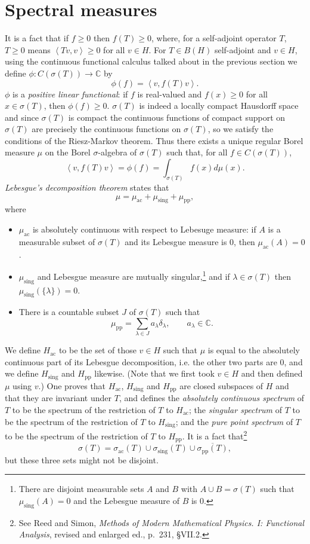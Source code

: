 \documentclass{article}
\newcommand{\inner}[2]{\left\langle #1, #2 \right\rangle}
\begin{document}
\section{Spectral measures}
It is a fact that if $f \geq 0$ then $f(T) \geq 0$, where, for a self-adjoint operator $T$, $T \geq 0$ means $\inner{Tv}{v} \geq 0$ for all $v \in H$.
For $T \in B(H)$ self-adjoint and $v \in H$, using the continuous functional calculus talked about in the previous section we
define $\phi:C(\sigma(T)) \to \mathbb{C}$ by
\[
\phi(f)=\inner{v}{f(T)v}.
\]
$\phi$ is a  {\em positive linear functional}: if $f$ is real-valued and $f(x) \geq 0$ for all $x \in \sigma(T)$, then 
$\phi(f) \geq 0$. $\sigma(T)$ is indeed a locally compact Hausdorff space
and since $\sigma(T)$ is compact the continuous functions of compact support on $\sigma(T)$ are precisely
the continuous functions on $\sigma(T)$, so we satisfy the conditions
of  the Riesz-Markov theorem. Thus there exists a 
unique
regular Borel measure $\mu$ on the Borel $\sigma$-algebra of $\sigma(T)$ such that, for all 
$f \in C(\sigma(T))$, 
\[
\inner{v}{f(T)v}=\phi(f)=\int_{\sigma(T)} f(x) d\mu(x).
\]
 {\em Lebesgue's decomposition theorem} states that
\[
\mu=\mu_{\textrm{ac}}+\mu_{\textrm{sing}}+\mu_{\textrm{pp}},
\]
where
\begin{itemize}
\item $\mu_{\textrm{ac}}$ is absolutely continuous with respect to Lebesuge measure: if $A$ is a measurable
subset of $\sigma(T)$ and its Lebesgue measure is $0$, then $\mu_{\textrm{ac}}(A)=0$.
\item $\mu_{\textrm{sing}}$ and Lebesgue measure are mutually
singular,\footnote{There are disjoint measurable sets $A$ and $B$
with $A \cup B = \sigma(T)$ such that $\mu_{\textrm{sing}}(A)=0$ and the Lebesgue measure of $B$ is $0$.} and if $\lambda \in \sigma(T)$ then $\mu_{\textrm{sing}}(\{\lambda\})=0$.
\item  There is a countable subset $J$ of $\sigma(T)$ such that
\[
\mu_{\textrm{pp}}=\sum_{\lambda \in J} a_\lambda \delta_\lambda, \qquad a_\lambda \in \mathbb{C}.
\]
\end{itemize}

We define $H_{\textrm{ac}}$ to be the set of those $v \in H$ such that $\mu$ is equal to the absolutely
continuous part of its Lebesgue decomposition, i.e. the other two parts are 0, and we define 
 $H_{\textrm{sing}}$ and $H_{\textrm{pp}}$ likewise. (Note that we first took $v \in H$ and then defined $\mu$ using $v$.) One proves that 
 $H_{\textrm{ac}}$, $H_{\textrm{sing}}$ and $H_{\textrm{pp}}$
  are closed subspaces of $H$ and that
 they are invariant under $T$, and defines
the {\em absolutely continuous spectrum} of $T$ to be the spectrum of the restriction of $T$ to $H_{\textrm{ac}}$;
the {\em singular spectrum} of $T$ to be the spectrum of the restriction of $T$ to $H_{\textrm{sing}}$;
and the {\em pure point spectrum} of $T$ to be the spectrum of the restriction of $T$ to
$H_{\textrm{pp}}$. It is a fact that\footnote{See Reed and Simon, {\em Methods of Modern Mathematical Physics. I: Functional Analysis}, revised and enlarged ed.,
p.~231, \S VII.2.}
\[
\sigma(T) =\sigma_{\textrm{ac}}(T) \cup  \sigma_{\textrm{sing}}(T) \cup \overline{\sigma_{\textrm{pp}}(T)},
\]
but these three sets might not be disjoint.
\end{document}
